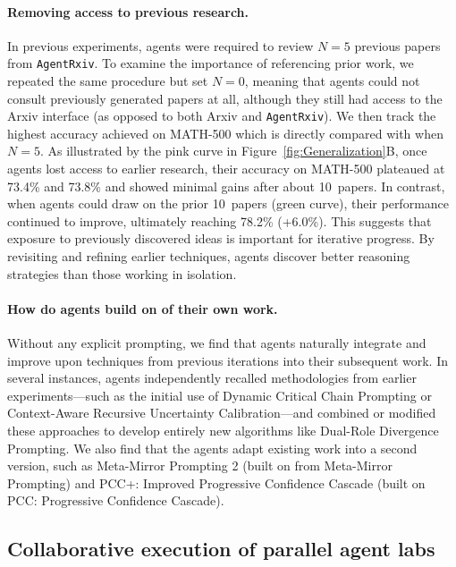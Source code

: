 \documentclass[11pt, a4paper]{include/gdm_format}
\begin{document}
\paragraph{Removing access to previous research.} In previous experiments, agents were required to review \(N=5\) previous papers from \texttt{AgentRxiv}. To examine the importance of referencing prior work, we repeated the same procedure but set \(N=0\), meaning that agents could not consult previously generated papers at all, although they still had access to the Arxiv interface (as opposed to both Arxiv and \texttt{AgentRxiv}). We then track the highest accuracy achieved on MATH-500 which is directly compared with when \(N=5\). As illustrated by the pink curve in Figure~\ref{fig:Generalization}B, once agents lost access to earlier research, their accuracy on MATH-500 plateaued at 73.4\% and 73.8\% and showed minimal gains after about 10~papers. In contrast, when agents could draw on the prior 10~papers (green curve), their performance continued to improve, ultimately reaching 78.2\% ({\color{darkpastelgreen}+6.0\%}). This suggests that exposure to previously discovered ideas is important for iterative progress. By revisiting and refining earlier techniques, agents discover better reasoning strategies than those working in isolation.

\paragraph{How do agents build on of their own work.} Without any explicit prompting, we find that agents naturally integrate and improve upon techniques from previous iterations into their subsequent work. In several instances, agents independently recalled methodologies from earlier experiments—such as the initial use of Dynamic Critical Chain Prompting or Context-Aware Recursive Uncertainty Calibration—and combined or modified these approaches to develop entirely new algorithms like Dual-Role Divergence Prompting. We also find that the agents adapt existing work into a second version, such as Meta-Mirror Prompting 2 (built on from Meta-Mirror Prompting) and PCC+: Improved Progressive Confidence Cascade (built on PCC: Progressive Confidence Cascade).


\subsection{Collaborative execution of parallel agent labs}
\end{document}
